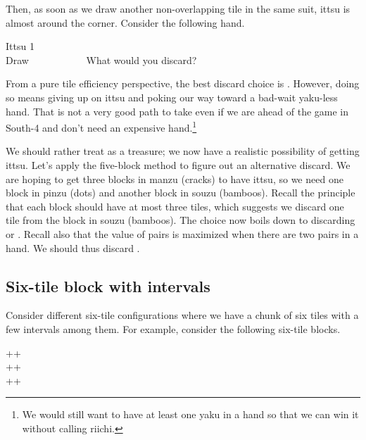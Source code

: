 \noindent
Then, as soon as we draw another non-overlapping tile in the same suit,  {\jap ittsu} is almost around the corner. 
Consider the following hand. 

\begin{itembox}[r]{{\jap Ittsu} 1}
\bp
{}~\\
\hfill\footnotesize{Draw~~~~~~~~~~~}
\ep
\vspace{-17pt}What would you discard? \vspace{-5pt}
\end{itembox}
\noindent
From a pure tile efficiency perspective, the best discard choice is {\LARGE{}}.
However, doing so means giving up on {\jap ittsu} and poking our way toward a bad-wait {\jap yaku}-less hand. That is not a very good path to take even if we are ahead of the game in South-4 and don't need an expensive hand.\footnote{We would still want to have at least one {\jap yaku} in a hand so that we can win it without calling riichi.}

\bigskip
We should rather treat {\LARGE{}} as a treasure; we now have a realistic possibility of getting {\jap ittsu}. Let's apply the five-block method to figure out an alternative discard.
\emj
We are hoping to get three blocks in {\jap manzu} (cracks) to have {\jap ittsu}, so we need one block in {\jap pinzu} (dots) and another block in {\jap souzu} (bamboos). Recall the principle that each block should have at most three tiles, which suggests we discard one tile from the block in {\jap souzu} (bamboos). The choice now boils down to discarding {\LARGE{}} or {\LARGE{}}. Recall also that the value of pairs is maximized when there are two pairs in a hand. We should thus discard {\LARGE{}}. 

\subsection{Six-tile block with intervals}
Consider different six-tile configurations where we have a chunk of six tiles with a few intervals among them. For example, consider the following six-tile blocks. 

{\begin{center}
{\Huge{}++}\\ [\sep]
{\Huge{}++}\\ [\sep]
{\Huge{}++}
\end{center}}

